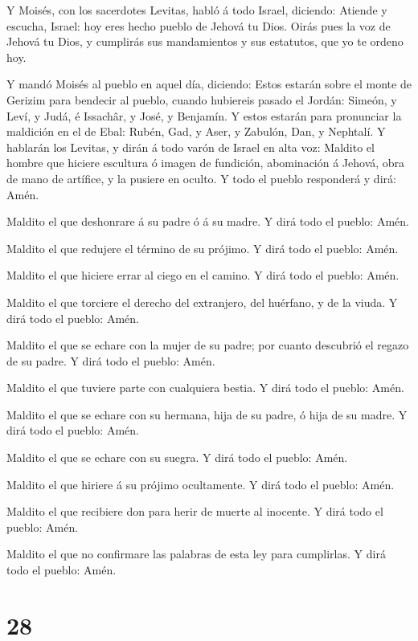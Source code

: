  Y Moisés, con los sacerdotes Levitas, habló á todo Israel,
diciendo: Atiende y escucha, Israel: hoy eres hecho pueblo de Jehová tu
Dios.  Oirás pues la voz de Jehová tu Dios, y cumplirás sus
mandamientos y sus estatutos, que yo te ordeno hoy.

 Y mandó Moisés al pueblo en aquel día, diciendo:
 Estos estarán sobre el monte de Gerizim para bendecir al
pueblo, cuando hubiereis pasado el Jordán: Simeón, y Leví, y Judá, é
Issachâr, y José, y Benjamín.  Y estos estarán para
pronunciar la maldición en el de Ebal: Rubén, Gad, y Aser, y Zabulón,
Dan, y Nephtalí.  Y hablarán los Levitas, y dirán á todo
varón de Israel en alta voz:  Maldito el hombre que hiciere
escultura ó imagen de fundición, abominación á Jehová, obra de mano de
artífice, y la pusiere en oculto. Y todo el pueblo responderá y dirá:
Amén.

 Maldito el que deshonrare á su padre ó á su madre. Y dirá
todo el pueblo: Amén.

 Maldito el que redujere el término de su prójimo. Y dirá
todo el pueblo: Amén.

 Maldito el que hiciere errar al ciego en el camino. Y dirá
todo el pueblo: Amén.

 Maldito el que torciere el derecho del extranjero, del
huérfano, y de la viuda. Y dirá todo el pueblo: Amén.

 Maldito el que se echare con la mujer de su padre; por
cuanto descubrió el regazo de su padre. Y dirá todo el pueblo: Amén.

 Maldito el que tuviere parte con cualquiera bestia. Y dirá
todo el pueblo: Amén.

 Maldito el que se echare con su hermana, hija de su padre,
ó hija de su madre. Y dirá todo el pueblo: Amén.

 Maldito el que se echare con su suegra. Y dirá todo el
pueblo: Amén.

 Maldito el que hiriere á su prójimo ocultamente. Y dirá
todo el pueblo: Amén.

 Maldito el que recibiere don para herir de muerte al
inocente. Y dirá todo el pueblo: Amén.

 Maldito el que no confirmare las palabras de esta ley para
cumplirlas. Y dirá todo el pueblo: Amén.

\hypertarget{section-27}{%
\section{28}\label{section-27}}

